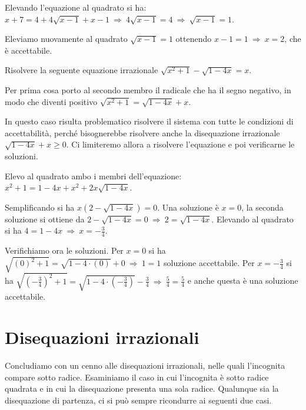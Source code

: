 \begin{exrig}
\begin{esempio}
Elevando l'equazione al quadrato si ha: $x+7=4+4\sqrt{x-1}+x-1 \:\Rightarrow\: 4\sqrt{x-1}=4 \:\Rightarrow\: \sqrt{x-1}=1$.

Eleviamo nuovamente al quadrato $\sqrt{x-1}=1$ ottenendo $x-1=1\:\Rightarrow\: x=2$, che è accettabile.
\end{esempio}

\begin{esempio}
Risolvere la seguente equazione irrazionale $\sqrt{x^2+1}-\sqrt{1-4x}=x$.

Per prima cosa porto al secondo membro il radicale che ha il segno negativo, in modo che diventi positivo $\sqrt{x^2+1}=\sqrt{1-4x}+x$.

In questo caso risulta problematico risolvere il sistema con tutte le condizioni di accettabilità, perché bisognerebbe risolvere anche la disequazione irrazionale $\sqrt{1-4x}+x\ge 0$.
Ci limiteremo allora a risolvere l'equazione e poi verificarne le soluzioni.

Elevo al quadrato ambo i membri dell'equazione: $x^2+1=1-4x+x^2+2x\sqrt{1-4x}$.

Semplificando si ha $x(2-\sqrt{1-4x})=0$. Una soluzione è $x=0$, la seconda soluzione si ottiene da $2-\sqrt{1-4x}=0\:\Rightarrow\: 2=\sqrt{1-4x}$. Elevando al quadrato si ha $4=1-4x\:\Rightarrow\: x=-\frac 3 4$.

Verifichiamo ora le soluzioni. Per $x=0$ si ha $\sqrt{(0)^2+1}=\sqrt{1-4\cdot (0)}+0\:\Rightarrow\: 1=1$ soluzione accettabile. Per $x=-\frac 3 4$ si ha $\sqrt{\left(-\frac 3 4\right)^2+1}=\sqrt{1-4\cdot\left(-\frac 3 4\right)}-\frac 3 4\:\Rightarrow\:\frac 5 4=\frac 5 4$ e anche questa è una soluzione accettabile.
\end{esempio}
\end{exrig}
\ovalbox{\risolvii \ref{ese:8.10}, \ref{ese:8.11}, \ref{ese:8.12}, \ref{ese:8.13}, \ref{ese:8.14}, \ref{ese:8.15}, \ref{ese:8.16}, \ref{ese:8.17}, \ref{ese:8.18}}

\section{Disequazioni irrazionali}

Concludiamo con un cenno alle disequazioni irrazionali, nelle quali l'incognita compare sotto radice. Esaminiamo il caso in cui l'incognita è sotto radice quadrata e in cui la disequazione presenta una sola radice. Qualunque sia la disequazione di partenza, ci si può sempre ricondurre ai seguenti due casi.

